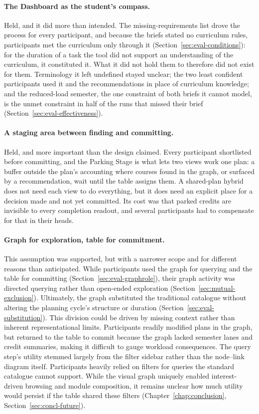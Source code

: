 \paragraph{The Dashboard as the student's compass.}
Held, and it did more than intended. The missing-requirements list drove the process for every participant, and because the briefs stated no curriculum rules, participants met the curriculum only through it (Section~\ref{sec:eval-conditions}): for the duration of a task the tool did not support an understanding of the curriculum, it constituted it. What it did not hold them to therefore did not exist for them. Terminology it left undefined stayed unclear; the two least confident participants used it and the recommendations in place of curriculum knowledge; and the reduced-load semester, the one constraint of both briefs it cannot model, is the unmet constraint in half of the runs that missed their brief (Section~\ref{sec:eval-effectiveness}).

\paragraph{A staging area between finding and committing.}
Held, and more important than the design claimed. Every participant shortlisted before committing, and the Parking Stage is what lets two views work one plan: a buffer outside the plan's accounting where courses found in the graph, or surfaced by a recommendation, wait until the table assigns them. A shared-plan hybrid does not need each view to do everything, but it does need an explicit place for a decision made and not yet committed. Its cost was that parked credits are invisible to every completion readout, and several participants had to compensate for that in their heads.

\paragraph{Graph for exploration, table for commitment.}
This assumption was supported, but with a narrower scope and for different reasons than anticipated. While participants used the graph for querying and the table for committing (Section~\ref{sec:eval-graphrole}), their graph activity was directed querying rather than open-ended exploration (Section~\ref{sec:mutual-exclusion}). Ultimately, the graph substituted the traditional catalogue without altering the planning cycle's structure or duration (Section~\ref{sec:eval-substitution}).
This division could be driven by missing context rather than inherent representational limits. Participants readily modified plans in the graph, but returned to the table to commit because the graph lacked semester lanes and credit summaries, making it difficult to gauge workload consequences.
The query step's utility stemmed largely from the filter sidebar rather than the node--link diagram itself. Participants heavily relied on filters for queries the standard catalogue cannot support. While the visual graph uniquely enabled interest-driven browsing and module composition, it remains unclear how much utility would persist if the table shared these filters (Chapter~\ref{chap:conclusion}, Section~\ref{sec:concl-future}).

